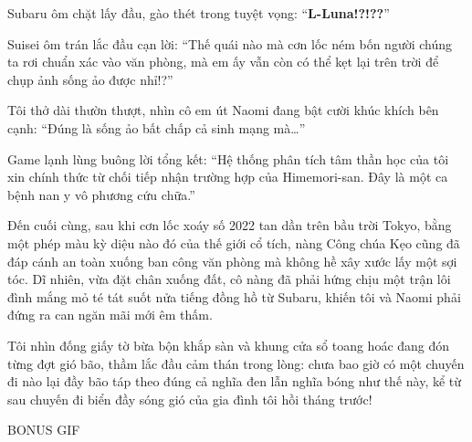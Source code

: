 \documentclass[../main.tex]{subfiles}
\begin{document}

Subaru ôm chặt lấy đầu, gào thét trong tuyệt vọng: ``\textbf{L-Luna!?!??}''

Suisei ôm trán lắc đầu cạn lời: ``Thế quái nào mà cơn lốc ném bốn người chúng ta rơi chuẩn xác vào văn phòng, mà em ấy vẫn còn có thể kẹt lại trên trời để chụp ảnh sống ảo được nhỉ!?''

Tôi thở dài thườn thượt, nhìn cô em út Naomi đang bật cười khúc khích bên cạnh: ``Đúng là sống ảo bất chấp cả sinh mạng mà\dots''

Game lạnh lùng buông lời tổng kết: ``Hệ thống phân tích tâm thần học của tôi xin chính thức từ chối tiếp nhận trường hợp của Himemori-san. Đây là một ca bệnh nan y vô phương cứu chữa.''

Đến cuối cùng, sau khi cơn lốc xoáy số 2022 tan dần trên bầu trời Tokyo, bằng một phép màu kỳ diệu nào đó của thế giới cổ tích, nàng Công chúa Kẹo cũng đã đáp cánh an toàn xuống ban công văn phòng mà không hề xây xước lấy một sợi tóc. Dĩ nhiên, vừa đặt chân xuống đất, cô nàng đã phải hứng chịu một trận lôi đình mắng mỏ té tát suốt nửa tiếng đồng hồ từ Subaru, khiến tôi và Naomi phải đứng ra can ngăn mãi mới êm thấm.

Tôi nhìn đống giấy tờ bừa bộn khắp sàn và khung cửa sổ toang hoác đang đón từng đợt gió bão, thầm lắc đầu cảm thán trong lòng: chưa bao giờ có một chuyến đi nào lại đầy bão táp theo đúng cả nghĩa đen lẫn nghĩa bóng như thế này, kể từ sau chuyến đi biển đầy sóng gió của gia đình tôi hồi tháng trước!

\begin{center}
  {\ab BONUS GIF}
\end{center}
\end{document}
